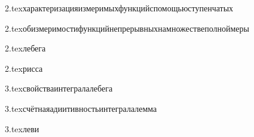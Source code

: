 {2.tex}{характеризацияизмеримыхфункцийспомощьюступенчатых}

{2.tex}{обизмеримостифункцийнепрерывныхнамножествеполноймеры}

{2.tex}{лебега}

{2.tex}{рисса}

{3.tex}{свойстваинтегралалебега}

{3.tex}{счётнаяадиитивностьинтегралалемма}

{3.tex}{леви}
















